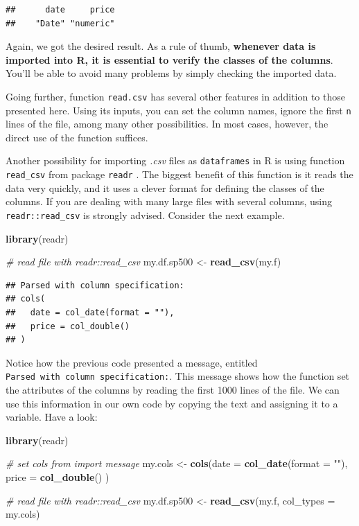 \documentclass[11pt,]{book}
\newenvironment{Shaded}{\begin{snugshade}}{\end{snugshade}}
\newcommand{\KeywordTok}[1]{\textcolor[rgb]{0.27,0.27,0.27}{\textbf{#1}}}
\newcommand{\DataTypeTok}[1]{\textcolor[rgb]{0.27,0.27,0.27}{#1}}
\newcommand{\StringTok}[1]{\textcolor[rgb]{0.5,0.5,0.5}{#1}}
\newcommand{\CommentTok}[1]{\textcolor[rgb]{0.56,0.35,0.01}{\textit{#1}}}
\newcommand{\NormalTok}[1]{#1}
\begin{document}
\begin{verbatim}
##      date     price 
##    "Date" "numeric"
\end{verbatim}

Again, we got the desired result. As a rule of thumb, \textbf{whenever
data is imported into R, it is essential to verify the classes of the
columns}. You'll be able to avoid many problems by simply checking the
imported data.

Going further, function \texttt{read.csv} has several other features in
addition to those presented here. Using its inputs, you can set the
column names, ignore the first \texttt{n} lines of the file, among many
other possibilities. In most cases, however, the direct use of the
function suffices.

Another possibility for importing \emph{.csv} files as
\texttt{dataframes} in R is using function \texttt{read\_csv} from
package \texttt{readr} \citep{readr}. The biggest benefit of this
function is it reads the data very quickly, and it uses a clever format
for defining the classes of the columns. If you are dealing with many
large files with several columns, using \texttt{readr::read\_csv} is
strongly advised. Consider the next example. 

\begin{Shaded}
\begin{Highlighting}[]
\KeywordTok{library}\NormalTok{(readr)}

\CommentTok{# read file with readr::read_csv}
\NormalTok{my.df.sp500 <-}\StringTok{ }\KeywordTok{read_csv}\NormalTok{(my.f)}
\end{Highlighting}
\end{Shaded}

\begin{verbatim}
## Parsed with column specification:
## cols(
##   date = col_date(format = ""),
##   price = col_double()
## )
\end{verbatim}

Notice how the previous code presented a message, entitled
\texttt{Parsed\ with\ column\ specification:}. This message shows how
the function set the attributes of the columns by reading the first 1000
lines of the file. We can use this information in our own code by
copying the text and assigning it to a variable. Have a look:

\begin{Shaded}
\begin{Highlighting}[]
\KeywordTok{library}\NormalTok{(readr)}

\CommentTok{# set cols from import message}
\NormalTok{my.cols <-}\StringTok{ }\KeywordTok{cols}\NormalTok{(}\DataTypeTok{date =} \KeywordTok{col_date}\NormalTok{(}\DataTypeTok{format =} \StringTok{""}\NormalTok{),}
                \DataTypeTok{price =} \KeywordTok{col_double}\NormalTok{() ) }

\CommentTok{# read file with readr::read_csv}
\NormalTok{my.df.sp500 <-}\StringTok{ }\KeywordTok{read_csv}\NormalTok{(my.f, }\DataTypeTok{col_types =}\NormalTok{ my.cols)}
\end{Highlighting}
\end{Shaded}
\end{document}

